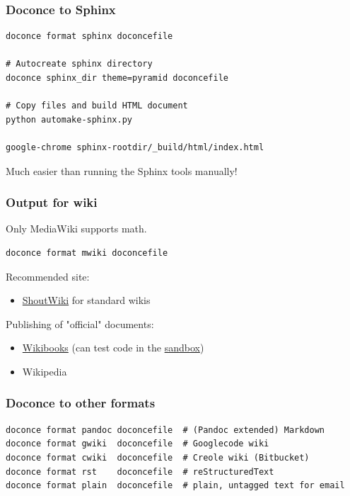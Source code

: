 \documentclass{beamer}
\newcounter{doconce:exercise:counter}
\newcounter{doconce:movie:counter}
\begin{document}
\begin{frame}
\frametitle{Doconce to Sphinx}

\begin{Verbatim}[numbers=none,fontsize=\fontsize{9pt}{9pt},baselinestretch=0.95]
doconce format sphinx doconcefile

# Autocreate sphinx directory
doconce sphinx_dir theme=pyramid doconcefile

# Copy files and build HTML document
python automake-sphinx.py

google-chrome sphinx-rootdir/_build/html/index.html
\end{Verbatim}

Much easier than running the Sphinx tools manually!
\end{frame}

\begin{frame}
\frametitle{Output for wiki}

Only MediaWiki supports math.

\begin{Verbatim}[numbers=none,fontsize=\fontsize{9pt}{9pt},baselinestretch=0.95]
doconce format mwiki doconcefile
\end{Verbatim}


Recommended site:

\begin{itemize}
 \item \href{{http://doconcedemo.shoutwiki.com/wiki/Doconce_demo_page}}{ShoutWiki}
   for standard wikis
\end{itemize}

\noindent
Publishing of "official" documents:

\begin{itemize}
 \item \href{{http://en.wikibooks.org/wiki/Wikibooks:WIW}}{Wikibooks}
   (can test code in the \href{{http://en.wikibooks.org/wiki/Wikibooks:Sandbox}}{sandbox})

 \item Wikipedia
\end{itemize}

\noindent
\end{frame}

\begin{frame}
\frametitle{Doconce to other formats}

\begin{Verbatim}[numbers=none,fontsize=\fontsize{9pt}{9pt},baselinestretch=0.95]
doconce format pandoc doconcefile  # (Pandoc extended) Markdown
doconce format gwiki  doconcefile  # Googlecode wiki
doconce format cwiki  doconcefile  # Creole wiki (Bitbucket)
doconce format rst    doconcefile  # reStructuredText
doconce format plain  doconcefile  # plain, untagged text for email
\end{Verbatim}
\end{frame}
\end{document}
